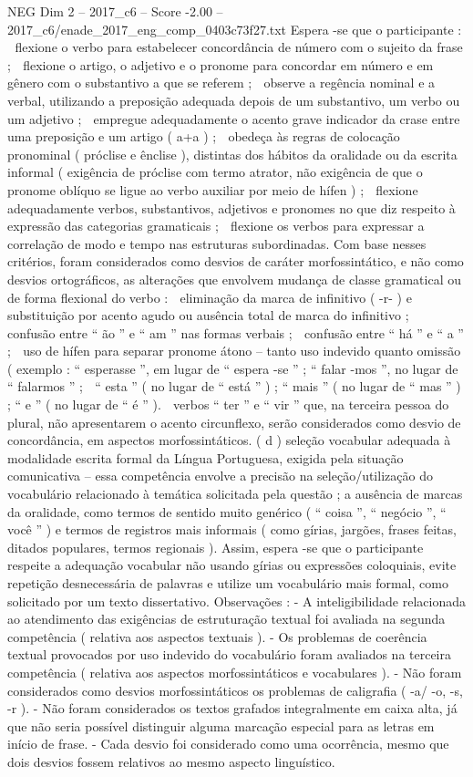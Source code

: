 \begin{textsample}{NEG Dim 2 – 2017\_c6 – Score -2.00 – 2017\_c6/enade\_2017\_eng\_comp\_0403c73f27.txt}
Espera -se que o participante :  flexione o verbo para estabelecer concordância de número com o sujeito da frase ;  flexione o artigo, o adjetivo e o pronome para concordar em número e em gênero com o substantivo a que se referem ;  observe a regência nominal e a verbal, utilizando a preposição adequada depois de um substantivo, um verbo ou um adjetivo ;  empregue adequadamente o acento grave indicador da crase entre uma preposição e um artigo ( a+a ) ;  obedeça às regras de colocação pronominal ( próclise e ênclise ), distintas dos hábitos da oralidade ou da escrita informal ( exigência de próclise com termo atrator, não exigência de que o pronome oblíquo se ligue ao verbo auxiliar por meio de hífen ) ;  flexione adequadamente verbos, substantivos, adjetivos e pronomes no que diz respeito à expressão das categorias gramaticais ;  flexione os verbos para expressar a correlação de modo e tempo nas estruturas subordinadas.
Com base nesses critérios, foram considerados como desvios de caráter morfossintático, e não como desvios ortográficos, as alterações que envolvem mudança de classe gramatical ou de forma flexional do verbo :  eliminação da marca de infinitivo ( -r- ) e substituição por acento agudo ou ausência total de marca do infinitivo ;  confusão entre “ ão ” e “ am ” nas formas verbais ;  confusão entre “ há ” e “ a ” ;  uso de hífen para separar pronome átono – tanto uso indevido quanto omissão ( exemplo : “ esperasse ”, em lugar de “ espera -se ” ; “ falar -mos ”, no lugar de “ falarmos ” ;  “ esta ” ( no lugar de “ está ” ) ; “ mais ” ( no lugar de “ mas ” ) ; “ e ” ( no lugar de “ é ” ).  verbos “ ter ” e “ vir ” que, na terceira pessoa do plural, não apresentarem o acento circunflexo, serão considerados como desvio de concordância, em aspectos morfossintáticos. ( d ) seleção vocabular adequada à modalidade escrita formal da Língua Portuguesa, exigida pela situação comunicativa – essa competência envolve a precisão na seleção/utilização do vocabulário relacionado à temática solicitada pela questão ; a ausência de marcas da oralidade, como termos de sentido muito genérico ( “ coisa ”, “ negócio ”, “ você ” ) e termos de registros mais informais ( como gírias, jargões, frases feitas, ditados populares, termos regionais ).
Assim, espera -se que o participante respeite a adequação vocabular não usando gírias ou expressões coloquiais, evite repetição desnecessária de palavras e utilize um vocabulário mais formal, como solicitado por um texto dissertativo.
Observações : - A inteligibilidade relacionada ao atendimento das exigências de estruturação textual foi avaliada na segunda competência ( relativa aos aspectos textuais ). - Os problemas de coerência textual provocados por uso indevido do vocabulário foram avaliados na terceira competência ( relativa aos aspectos morfossintáticos e vocabulares ). - Não foram considerados como desvios morfossintáticos os problemas de caligrafia ( -a/ -o, -s, -r ). - Não foram considerados os textos grafados integralmente em caixa alta, já que não seria possível distinguir alguma marcação especial para as letras em início de frase. - Cada desvio foi considerado como uma ocorrência, mesmo que dois desvios fossem relativos ao mesmo aspecto linguístico.

\end{textsample}
